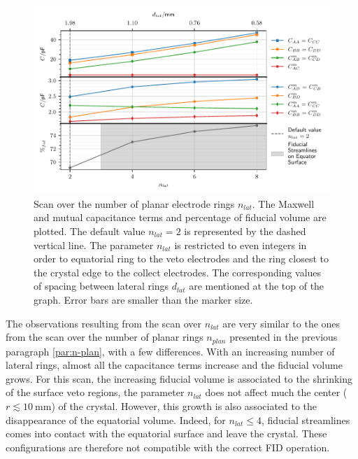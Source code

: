 \begin{figure}
\centering
\includegraphics[scale=1]{Figures/ElectrodesScan/capacitance_fiducial_n_lat.pdf}
\caption{Scan over the number of planar electrode rings $n_{lat}$. The Maxwell and mutual capacitance terms and percentage of fiducial volume are plotted. The default value $n_{lat}=2$ is represented by the dashed vertical line. The parameter $n_{lat}$ is restricted to even integers in order to equatorial ring to the veto electrodes and the ring closest to the crystal edge to the collect electrodes. The corresponding values of spacing between lateral rings $d_{lat}$ are mentioned at the top of the graph. Error bars are smaller than the marker size.}
\label{fig:capacitance-fiducial-n-lat}
\end{figure}

The observations resulting from the scan over $n_{lat}$ are very similar to the ones from the scan over the number of planar rings $n_{plan}$ presented in the previous paragraph \ref{par:n-plan}, with a few differences. With an increasing number of lateral rings, almost all the capacitance terms increase and the fiducial volume grows.
For this scan, the increasing fiducial volume is associated to the shrinking of the surface veto regions, the parameter $n_{lat}$ does not affect much the center ($r\lesssim\SI{10}{\mm}$) of the crystal. However, this growth is also associated to the disappearance of the equatorial volume. Indeed, for $n_{lat} \leq 4$, fiducial streamlines comes into contact with the equatorial surface and leave the crystal. These configurations are therefore not compatible with the correct FID operation.

